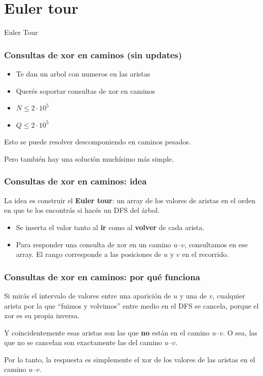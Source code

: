 \section{Euler tour}

\begin{frame}
\centering
\huge Euler Tour
\end{frame}

\begin{frame}
  \frametitle{Consultas de xor en caminos (sin updates)}

  \begin{itemize}
    \item Te dan un arbol con numeros en las aristas
    \item Querés soportar consultas de xor en caminos
    \item \(N \leq 2 \cdot 10^5\)
    \item \(Q \leq 2 \cdot 10^5\)
  \end{itemize}
  Esto se puede resolver descomponiendo en caminos pesados.

  \vspace{0.75em}

  Pero también hay una solución muchísimo más simple.
\end{frame}

\begin{frame}
  \frametitle{Consultas de xor en caminos: idea}

  La idea es construir el \textbf{Euler tour}: un array de los valores de aristas en el orden en que te los encontrás si hacés un DFS del árbol.

  \vspace{0.75em}

  \begin{itemize}
    \item Se inserta el valor tanto al \textbf{ir} como al \textbf{volver} de cada arista.
    \item Para responder una consulta de xor en un camino \(u\)--\(v\), consultamos en ese array. El rango corresponde a las posiciones de \(u\) y \(v\) en el recorrido.
  \end{itemize}
\end{frame}

\begin{frame}
  \frametitle{Consultas de xor en caminos: por qué funciona}

  Si mirás el intervalo de valores entre una aparición de \(u\) y una de \(v\), cualquier arista por la que ``fuimos y volvimos'' entre medio en el DFS se cancela, porque el xor es su propia inversa.

  \vspace{0.75em}

  Y coincidentemente esas aristas son las que \textbf{no} están en el camino \(u\)--\(v\). O sea, las que no se cancelan son exactamente las del camino \(u\)--\(v\).

  \vspace{0.75em}

  Por lo tanto, la respuesta es simplemente el xor de los valores de las aristas en el camino \(u\)--\(v\).
\end{frame}

